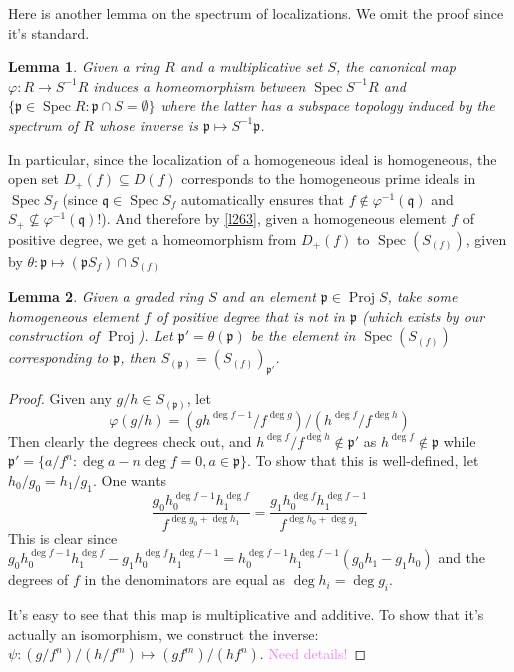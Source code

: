 \documentclass[12pt]{article}
\newtheorem{lemma}{Lemma}[subsection]
\theoremstyle{remark}
\newcommand{\Spec}[0]{\operatorname{Spec}}
\newcommand{\Proj}[0]{\operatorname{Proj}}
\begin{document}
	Here is another lemma on the spectrum of localizations. We omit the proof since it's standard.
	\begin{lemma}\label{l264}
		Given a ring $R$ and a multiplicative set $S$, the canonical map $\varphi:R\to S^{-1}R$ induces a homeomorphism between $\Spec S^{-1}R$ and $\{\mathfrak p\in \Spec R:\mathfrak p\cap S=\emptyset\}$ where the latter has a subspace topology induced by the spectrum of $R$ whose inverse is $\mathfrak p\mapsto S^{-1}\mathfrak p$.
	\end{lemma}
	In particular, since the localization of a homogeneous ideal is homogeneous, the open set $D_+(f)\subseteq D(f)$ corresponds to the homogeneous prime ideals in $\Spec S_f$ (since $\mathfrak q\in\Spec S_f$ automatically ensures that $f\notin\varphi^{-1}(\mathfrak q)$ and $S_+\not\subseteq \varphi^{-1}(\mathfrak q)$!). And therefore by \autoref{l263}, given a homogeneous element $f$ of positive degree, we get a homeomorphism from $D_+(f)$ to $\Spec(S_{(f)})$, given by $\theta:\mathfrak p\mapsto (\mathfrak pS_f)\cap S_{(f)}$

	\begin{lemma}\label{l265}
		Given a graded ring $S$ and an element $\mathfrak p\in\Proj S$, take some homogeneous element $f$ of positive degree that is not in $\mathfrak p$ (which exists by our construction of $\Proj$). Let $\mathfrak p'=\theta(\mathfrak p)$ be the element in $\Spec(S_{(f)})$ corresponding to $\mathfrak p$, then $S_{(\mathfrak p)}=(S_{(f)})_{\mathfrak p'}$.
	\end{lemma}
	\begin{proof}
		Given any $g/h\in S_{(\mathfrak p)}$, let
		\[\varphi(g/h)=(gh^{\deg f-1}/f^{\deg g})/(h^{\deg f}/f^{\deg h})\]
		Then clearly the degrees check out, and $h^{\deg f}/f^{\deg h}\notin\mathfrak p'$ as $h^{\deg f}\notin\mathfrak p$ while $\mathfrak p'=\{a/f^n:\deg a-n\deg f=0, a\in\mathfrak p\}$. To show that this is well-defined, let $h_0/g_0=h_1/g_1$. One wants
		\[\frac{g_0h_0^{\deg f-1}h_1^{\deg f}}{f^{{\deg g_0+\deg h_1}}}=\frac{g_1h_0^{\deg f}h_1^{\deg f-1}}{f^{\deg h_0+\deg g_1}}\]
		This is clear since $g_0h_0^{\deg f-1}h_1^{\deg f}-g_1h_0^{\deg f}h_1^{\deg f-1}=h_0^{\deg f-1}h_1^{\deg f-1}(g_0h_1-g_1h_0)$ and the degrees of $f$ in the denominators are equal as $\deg h_i=\deg g_i$.
		
		It's easy to see that this map is multiplicative and additive. To show that it's actually an isomorphism, we construct the inverse: $\psi:(g/f^{n})/(h/f^{m})\mapsto (gf^{m})/(hf^n)$. \textcolor{violet}{Need details!}
	\end{proof}
\end{document}
